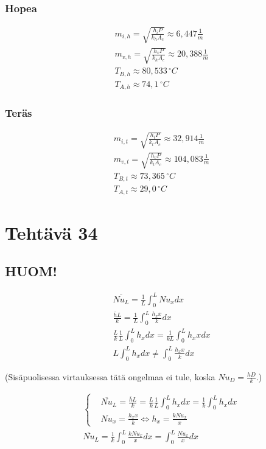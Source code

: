 \documentclass[12pt,a4paper,finnish]{article}
\begin{document}
\subsubsection{Hopea}

\begin{align}
 &m_{i,h} = \sqrt{\frac{h_iP}{k_hA_c}} \approx 6,447 \frac{1}{m}\\
 &m_{v,h} = \sqrt{\frac{h_vP}{k_hA_c}} \approx 20,388 \frac{1}{m}\\
 &T_{B,h} \approx 80,533\,^{\circ}C\\
 &T_{A,h} \approx 74,1\,^{\circ}C
\end{align}

\subsubsection{Teräs}

\begin{align}
 &m_{i,t} = \sqrt{\frac{h_iP}{k_tA_c}} \approx 32,914 \frac{1}{m}\\
 &m_{v,t} = \sqrt{\frac{h_vP}{k_tA_c}} \approx 104,083 \frac{1}{m}\\
 &T_{B,t} \approx 73,365\,^{\circ}C\\
 &T_{A,t} \approx 29,0\,^{\circ}C
\end{align}

\section{Tehtävä 34}

\subsection{HUOM!}

\begin{align}
 &\overline{Nu_L} = \frac{1}{L}\int_0^L Nu_x dx\\
 &\frac{\overline{h}L}{k} = \frac{1}{L}\int_0^L \frac{h_x x}{k} dx\\
 &\frac{L}{k}\frac{1}{L}\int_0^L h_x dx = \frac{1}{kL}\int_0^L h_x x dx\\
 &L\int_0^L h_x dx \neq \int_0^L \frac{h_x x}{k} dx
\end{align}

(Sisäpuolisessa virtauksessa tätä ongelmaa ei tule, koska $Nu_D = \frac{hD}{k}$.)

\begin{align}
 &\left\{
 \begin{aligned}
  &\overline{Nu}_L = \frac{\overline{h}L}{k} = \frac{L}{k}\frac{1}{L}\int_0^L h_x dx = \frac{1}{k}\int_0^L h_x dx\\
  &Nu_x = \frac{h_x x}{k} \Leftrightarrow h_x = \frac{kNu_x}{x}
 \end{aligned}\right.\\
 &\overline{Nu}_L = \frac{1}{k}\int_0^L \frac{kNu_x}{x} dx = \int_0^L \frac{Nu_x}{x} dx
\end{align}
\end{document}
